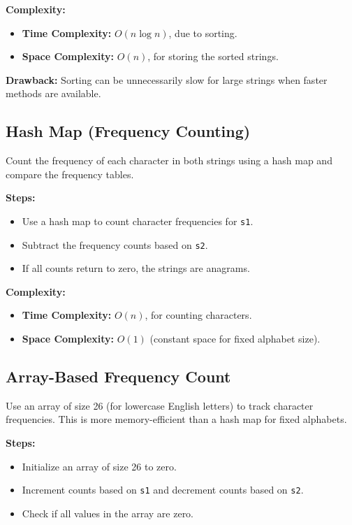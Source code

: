 \textbf{Complexity:}
\begin{itemize}
    \item \textbf{Time Complexity:} \(O(n \log n)\), due to sorting.
    \item \textbf{Space Complexity:} \(O(n)\), for storing the sorted strings.
\end{itemize}

\textbf{Drawback:} Sorting can be unnecessarily slow for large strings when faster methods are available.

\subsection*{Hash Map (Frequency Counting)}
Count the frequency of each character in both strings using a hash map and compare the frequency tables.

\textbf{Steps:}
\begin{itemize}
    \item Use a hash map to count character frequencies for \texttt{s1}.
    \item Subtract the frequency counts based on \texttt{s2}.
    \item If all counts return to zero, the strings are anagrams.
\end{itemize}

\textbf{Complexity:}
\begin{itemize}
    \item \textbf{Time Complexity:} \(O(n)\), for counting characters.
    \item \textbf{Space Complexity:} \(O(1)\) (constant space for fixed alphabet size).
\end{itemize}

\subsection*{Array-Based Frequency Count}
Use an array of size 26 (for lowercase English letters) to track character frequencies. This is more memory-efficient than a hash map for fixed alphabets.

\textbf{Steps:}
\begin{itemize}
    \item Initialize an array of size 26 to zero.
    \item Increment counts based on \texttt{s1} and decrement counts based on \texttt{s2}.
    \item Check if all values in the array are zero.
\end{itemize}

